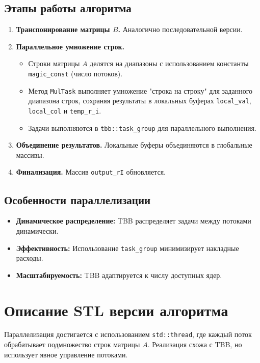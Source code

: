 \documentclass[a4paper,12pt]{article}
\begin{document}
\subsection{Этапы работы алгоритма}
\begin{enumerate}
    \item \textbf{Транспонирование матрицы \( B \).} Аналогично последовательной версии.
    \item \textbf{Параллельное умножение строк.} 
    \begin{itemize}
        \item Строки матрицы \( A \) делятся на диапазоны с использованием константы \texttt{magic\_const} (число потоков).
        \item Метод \texttt{MulTask} выполняет умножение "строка на строку" для заданного диапазона строк, сохраняя результаты в локальных буферах \texttt{local\_val}, \texttt{local\_col} и \texttt{temp\_r\_i}.
        \item Задачи выполняются в \texttt{tbb::task\_group} для параллельного выполнения.
    \end{itemize}
    \item \textbf{Объединение результатов.} Локальные буферы объединяются в глобальные массивы.
    \item \textbf{Финализация.} Массив \texttt{output\_rI} обновляется.
\end{enumerate}

\subsection{Особенности параллелизации}
\begin{itemize}
    \item \textbf{Динамическое распределение:} TBB распределяет задачи между потоками динамически.
    \item \textbf{Эффективность:} Использование \texttt{task\_group} минимизирует накладные расходы.
    \item \textbf{Масштабируемость:} TBB адаптируется к числу доступных ядер.
\end{itemize}

\section{Описание STL версии алгоритма}
Параллелизация достигается с использованием \texttt{std::thread}, где каждый поток обрабатывает подмножество строк матрицы \( A \). Реализация схожа с TBB, но использует явное управление потоками.
\end{document}

